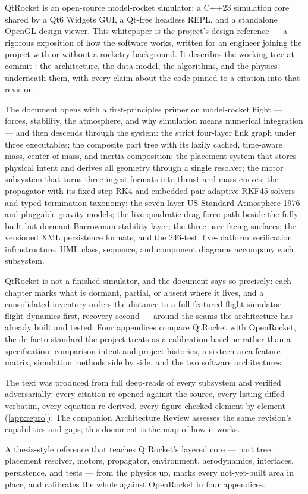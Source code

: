 QtRocket is an open-source model-rocket simulator: a C++23 simulation core shared by a
Qt6 Widgets GUI, a Qt-free headless REPL, and a standalone OpenGL design viewer. This
whitepaper is the project's design reference --- a rigorous exposition of how the
software works, written for an engineer joining the project with or without a rocketry
background. It describes the working tree at commit : the architecture,
the data model, the algorithms, and the physics underneath them, with every claim about
the code pinned to a  citation into that revision.

The document opens with a first-principles primer on model-rocket flight --- forces,
stability, the atmosphere, and why simulation means numerical integration --- and then
descends through the system: the strict four-layer link graph under three executables;
the composite part tree with its lazily cached, time-aware mass, center-of-mass, and
inertia composition; the placement system that stores physical intent and derives all
geometry through a single resolver; the motor subsystem that turns three ingest formats
into thrust and mass curves; the propagator with its fixed-step RK4 and embedded-pair
adaptive RKF45 solvers and typed termination taxonomy; the seven-layer US Standard
Atmosphere 1976 and pluggable gravity models; the live quadratic-drag force path beside
the fully built but dormant Barrowman stability layer; the three user-facing surfaces;
the versioned XML persistence formats; and the 246-test, five-platform verification
infrastructure. UML class, sequence, and component diagrams accompany each subsystem.

QtRocket is not a finished simulator, and the document says so precisely: each chapter
marks what is dormant, partial, or absent where it lives, and a consolidated inventory
orders the distance to a full-featured flight simulator --- flight dynamics first,
recovery second --- around the seams the architecture has already built and tested.
Four appendices compare QtRocket with OpenRocket, the de facto standard the project
treats as a calibration baseline rather than a specification: comparison intent and
project histories, a sixteen-area feature matrix, simulation methods side by side, and
the two software architectures.

The text was produced from full deep-reads of every subsystem and verified
adversarially: every citation re-opened against the source, every listing diffed
verbatim, every equation re-derived, every figure checked element-by-element
(\cref{app:repro}). The companion Architecture Review assesses the same revision's
capabilities and gaps; this document is the map of how it works.

\vspace{0.5em}
\begin{designrule}
A thesis-style reference that teaches QtRocket's layered core --- part tree, placement
resolver, motors, propagator, environment, aerodynamics, interfaces, persistence, and
tests --- from the physics up, marks every not-yet-built area in place, and calibrates
the whole against OpenRocket in four appendices.
\end{designrule}
